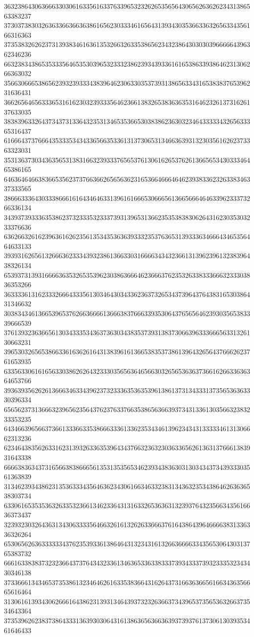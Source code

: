 36323864306366633030616335616337633965323262653565643065626362623431386563383237
37303738303263633663663638616562303334616564313934303536633632656334356166316363
37353832626237313938346163613532663263353865623432386430303039666664396362346236
66323834386535333564653530396532333238623934393361616538633938646231306266363032
35663066653865623932393334383964623063303537393138656334316538383765396231636431
36626564656333653161623032393335646236613832653836363531646232613731626137633035
38383963326437343731336432353134653536653038386236303234643333343265633365316437
61666437376664353335343433656635336131373065313466363931323035616262373363323031
35313637303436356531383166323933376565376130616265376261366565343033346465386165
64636464663836653562373766366265656362316536646664646239383362326338346337333565
38666333643033386661616434646331396161666530666561366566646463396233373266336134
34393739333635386237323335323337393139653136623535383830626431623035303233376636
63626632616239636162623561353435363639333235376365313933363466643465356464633133
39393162656132666362333439323861366330316666343432366131396239613238396438326134
65393731393166663635326535396230386366646236663762353263383336663233303836353266
36333361316233326664333561303464303433623637326534373964376438316530386431346632
30383434613665396537626636666136663837666339353064376565646239303565383339666539
37613932363665613034333534363736303438353739313837306639633366656331326130663231
39653032656538663361636261643138396161366538353738613964326564376662623761653935
63356330616165633038626264323330356563646566303265653636373661626633636364653766
39363935626261366634633439623732333635363539613861373134333137356536363330396334
65656237313666323965623564376237633766353865636639373431336130356632383233353235
64346639656637366133366335386663336133623534346139623434313333346131306662313236
62346438356263316231393263363539643437663236323036336562613631376661383931643338
66663836343731656638386665613531353565346239343836303130343437343933303561363839
31346239343862313536333435646362343061663463323831343632353438646263636538303734
63306165353536326335323661346233643131633265363631323937643235663435616636373437
32393230326436313430633335646632616132626336663761643864396466663831336336326264
65306562636333333437623539336138646431323431613266366663343565306430313765383732
66616338383732323664373764343233613463653363383337393433373932333532343430346138
37336661343465373538613234646261633538366431626437316636366561663436356665616464
31306161393430626661643862313931346439373232636637343965373565363266373534643364
37353962623837386433313639303064316138636563663639373937613730613039353461646433
